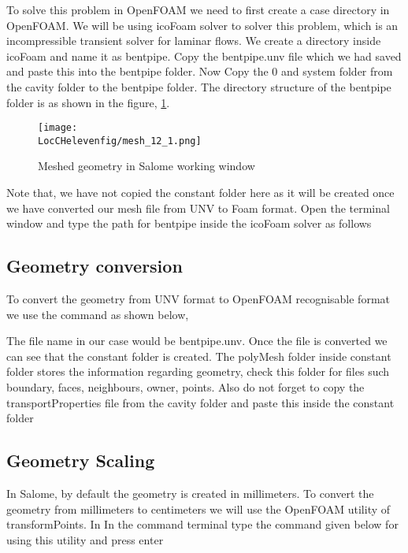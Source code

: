 To solve this problem in OpenFOAM we need to first create a case directory in OpenFOAM. We will be using icoFoam solver to solver this problem, which is an incompressible transient solver for laminar flows. We create a directory inside icoFoam and name it as bentpipe. Copy the bentpipe.unv file which we had saved and paste this into the bentpipe folder. Now Copy the 0 and system folder from the cavity folder to the bentpipe folder. The directory structure of the bentpipe folder is as shown in the figure, \ref{mesh_1}.

\begin{figure}[h]  
\centering
\texttt{[image: \\LocCHelevenfig/mesh\_12\_1.png]}
\caption{Meshed geometry in Salome working window}
\label{mesh_1}
\end{figure}

Note that, we have not copied the constant folder here as it will be created once we have converted our mesh file from UNV to Foam format. Open the terminal window and type the path for bentpipe inside the icoFoam solver as follows \\

\subsection{Geometry conversion}

To convert the geometry from UNV format to OpenFOAM recognisable format we use the command as shown below, \\


The file name in our case would be bentpipe.unv. Once the file is converted we can see that the constant folder is created. The polyMesh folder inside constant folder stores the information regarding geometry, check this folder for files such boundary, faces, neighbours, owner, points. Also do not forget to copy the transportProperties file from the cavity folder and paste this inside the constant folder

\subsection{Geometry Scaling}     

In Salome, by default the geometry is created in millimeters. To convert the geometry from millimeters to centimeters we will use the OpenFOAM utility of transformPoints. In In the command terminal type  the command given below for using this utility and press enter\\

